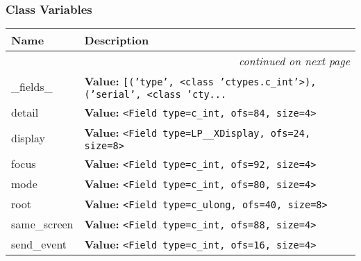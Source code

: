 
  \subsubsection{Class Variables}

    \vspace{-1cm}
\hspace{\varindent}\begin{longtable}{|p{\varnamewidth}|p{\vardescrwidth}|l}
\cline{1-2}
\cline{1-2} \centering \textbf{Name} & \centering \textbf{Description}& \\
\cline{1-2}
\endhead\cline{1-2}\multicolumn{3}{r}{\small\textit{continued on next page}}\\\endfoot\cline{1-2}
\endlastfoot\raggedright \_\-f\-i\-e\-l\-d\-s\-\_\- & \raggedright \textbf{Value:} 
{\tt \texttt{[}\texttt{(}\texttt{'}\texttt{type}\texttt{'}\texttt{, }{\textless}class 'ctypes.c\_int'{\textgreater}\texttt{)}\texttt{, }\texttt{(}\texttt{'}\texttt{serial}\texttt{'}\texttt{, }{\textless}class 'cty\texttt{...}}&\\
\cline{1-2}
\raggedright d\-e\-t\-a\-i\-l\- & \raggedright \textbf{Value:} 
{\tt {\textless}Field type=c\_int, ofs=84, size=4{\textgreater}}&\\
\cline{1-2}
\raggedright d\-i\-s\-p\-l\-a\-y\- & \raggedright \textbf{Value:} 
{\tt {\textless}Field type=LP\_\_XDisplay, ofs=24, size=8{\textgreater}}&\\
\cline{1-2}
\raggedright f\-o\-c\-u\-s\- & \raggedright \textbf{Value:} 
{\tt {\textless}Field type=c\_int, ofs=92, size=4{\textgreater}}&\\
\cline{1-2}
\raggedright m\-o\-d\-e\- & \raggedright \textbf{Value:} 
{\tt {\textless}Field type=c\_int, ofs=80, size=4{\textgreater}}&\\
\cline{1-2}
\raggedright r\-o\-o\-t\- & \raggedright \textbf{Value:} 
{\tt {\textless}Field type=c\_ulong, ofs=40, size=8{\textgreater}}&\\
\cline{1-2}
\raggedright s\-a\-m\-e\-\_\-s\-c\-r\-e\-e\-n\- & \raggedright \textbf{Value:} 
{\tt {\textless}Field type=c\_int, ofs=88, size=4{\textgreater}}&\\
\cline{1-2}
\raggedright s\-e\-n\-d\-\_\-e\-v\-e\-n\-t\- & \raggedright \textbf{Value:} 
{\tt {\textless}Field type=c\_int, ofs=16, size=4{\textgreater}}&\\

\end{longtable}

